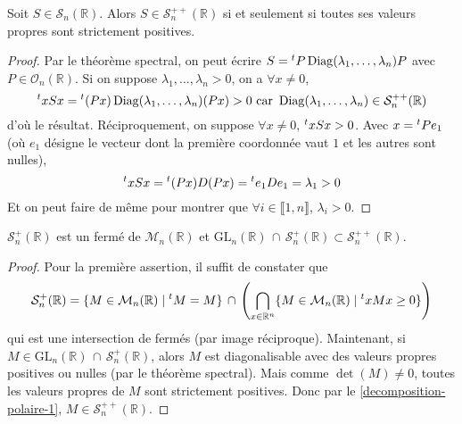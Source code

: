 





	\begin{lemma}
		\label{decomposition-polaire-1}
		Soit $S \in \mathcal{S}_n(\mathbb{R})$. Alors $S \in \mathcal{S}_n^{++}(\mathbb{R})$ si et seulement si toutes ses valeurs propres sont strictement positives.
	\end{lemma}

	\begin{proof}
		Par le théorème spectral, on peut écrire $S = \mathstrut ^t P \operatorname{Diag}(\lambda_1, \dots, \lambda_n) P$ avec $P \in \mathcal{O}_n(\mathbb{R})$. Si on suppose $\lambda_1, \dots, \lambda_n > 0$, on a $\forall x \neq 0$,
		\[ \mathstrut ^t x S x = \mathstrut ^t (Px) \operatorname{Diag}(\lambda_1, \dots, \lambda_n) (Px) > 0 \text{ car } \operatorname{Diag}(\lambda_1, \dots, \lambda_n) \in \mathcal{S}_n^{++}(\mathbb{R}) \]
		d'où le résultat.
		\newpar
		Réciproquement, on suppose $\forall x \neq 0$, $\mathstrut ^t x S x > 0$. Avec $x = \mathstrut ^t P e_1$ (où $e_1$ désigne le vecteur dont la première coordonnée vaut $1$ et les autres sont nulles),
		\[ \mathstrut ^t x S x = \mathstrut ^t (Px) D (Px) = \mathstrut ^t e_1 D e_1 = \lambda_1 > 0 \]
		Et on peut faire de même pour montrer que $\forall i \in \llbracket 1, n \rrbracket$, $\lambda_i > 0$.
	\end{proof}

	\begin{lemma}
		\label{decomposition-polaire-2}
		$\mathcal{S}_n^+(\mathbb{R})$ est un fermé de $\mathcal{M}_n(\mathbb{R})$ et $\mathrm{GL}_n(\mathbb{R}) \, \cap \, \mathcal{S}_n^{+}(\mathbb{R}) \subset \mathcal{S}_n^{++}(\mathbb{R})$.
	\end{lemma}

	\begin{proof}
		Pour la première assertion, il suffit de constater que
		\[ \mathcal{S}_n^+(\mathbb{R}) = \{ M \in \mathcal{M}_n(\mathbb{R}) \mid \mathstrut ^t M = M \} \, \cap \, \left( \bigcap_{x \in \mathbb{R}^n} \{ M \in \mathcal{M}_n(\mathbb{R}) \mid \mathstrut ^t x M x \geq 0 \} \right) \]
		qui est une intersection de fermés (par image réciproque). Maintenant, si $M \in \mathrm{GL}_n(\mathbb{R}) \, \cap \, \mathcal{S}_n^{+}(\mathbb{R})$, alors $M$ est diagonalisable avec des valeurs propres positives ou nulles (par le théorème spectral). Mais comme $\det(M) \neq 0$, toutes les valeurs propres de $M$ sont strictement positives. Donc par le \cref{decomposition-polaire-1}, $M \in \mathcal{S}_n^{++}(\mathbb{R})$.
	\end{proof}

